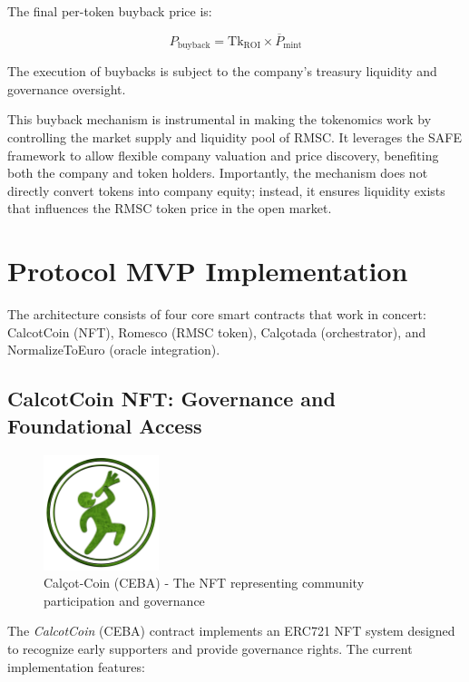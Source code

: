 \documentclass[conference]{IEEEtran}
\begin{document}
The final per-token buyback price is:

\begin{equation}
P_\text{buyback} = \mathrm{Tk_{ROI}} \times \overline{P}_\text{mint}
\end{equation}

The execution of buybacks is subject to the company's treasury liquidity and governance oversight.

This buyback mechanism is instrumental in making the tokenomics work by controlling the market supply and liquidity pool of RMSC. It leverages the SAFE framework to allow flexible company valuation and price discovery, benefiting both the company and token holders. Importantly, the mechanism does not directly convert tokens into company equity; instead, it ensures liquidity exists that influences the RMSC token price in the open market.

\section{Protocol MVP Implementation}



 The architecture consists of four core smart contracts that work in concert: CalcotCoin (NFT), Romesco (RMSC token), Calçotada (orchestrator), and NormalizeToEuro (oracle integration). 

\subsection{CalcotCoin NFT: Governance and Foundational Access}

\begin{figure}[ht]
\centering
\includegraphics[width=0.3\textwidth]{calcot-coin-logo.png}
\caption{Calçot-Coin (CEBA) - The NFT representing community participation and governance}
\label{fig:calcotcoin-logo}
\end{figure}

The \textit{CalcotCoin} (CEBA) contract implements an ERC721 NFT system designed to recognize early supporters and provide governance rights. The current implementation features:
\end{document}
